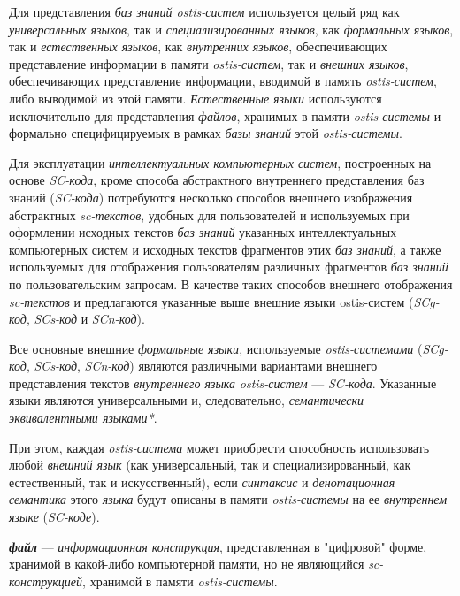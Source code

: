 Для представления \textit{баз знаний ostis-систем} используется целый ряд как \textit{универсальных языков}, так и \textit{специализированных языков}, как \textit{формальных языков}, так и \textit{естественных языков}, как \textit{внутренних языков}, обеспечивающих представление информации в памяти \textit{ostis-систем}, так и \textit{внешних языков}, обеспечивающих представление информации, вводимой в память \textit{ostis-систем}, либо выводимой из этой памяти. \textit{Естественные языки} используются исключительно для представления \textit{файлов}, хранимых в памяти \textit{ostis-системы} и формально специфицируемых в рамках \textit{базы знаний} этой \textit{ostis-системы}.

Для эксплуатации \textit{интеллектуальных компьютерных систем}, построенных на основе \textit{SC-кода}, кроме способа абстрактного внутреннего представления баз знаний (\textit{SC-кода}) потребуются несколько способов внешнего изображения абстрактных \textit{sc-текстов}, удобных для пользователей и используемых при оформлении исходных текстов \textit{баз знаний} указанных интеллектуальных компьютерных систем и исходных текстов фрагментов этих \textit{баз знаний}, а также используемых для отображения пользователям различных фрагментов \textit{баз знаний} по пользовательским запросам.
В качестве таких способов внешнего отображения \textit{sc-текстов} и предлагаются указанные выше внешние языки ostis-систем (\textit{SCg-код}, \textit{SCs-код} и  \textit{SCn-код}).

Все основные внешние \textit{формальные языки}, используемые \textit{ostis-системами} (\textit{SCg-код}, \textit{SCs-код}, \textit{SCn-код}) являются различными вариантами внешнего представления текстов \textit{внутреннего языка} \textit{ostis-систем} --- \textit{SC-кода}.
Указанные языки являются универсальными и, следовательно, \textit{семантически эквивалентными языками*}.

При этом, каждая \textit{ostis-система} может приобрести способность использовать любой \textit{внешний язык} (как универсальный, так и специализированный, как естественный, так и искусственный), если \textit{синтаксис} и \textit{денотационная семантика} этого \textit{языка} будут описаны в памяти \textit{ostis-системы} на ее \textit{внутреннем языке} (\textit{SC-коде}).

\textbf{\textit{файл}} --- \textit{информационная конструкция}, представленная в "цифровой" форме, хранимой в какой-либо компьютерной памяти, но не являющийся \textit{sc-конструкцией}, хранимой в памяти \textit{ostis-системы}.

